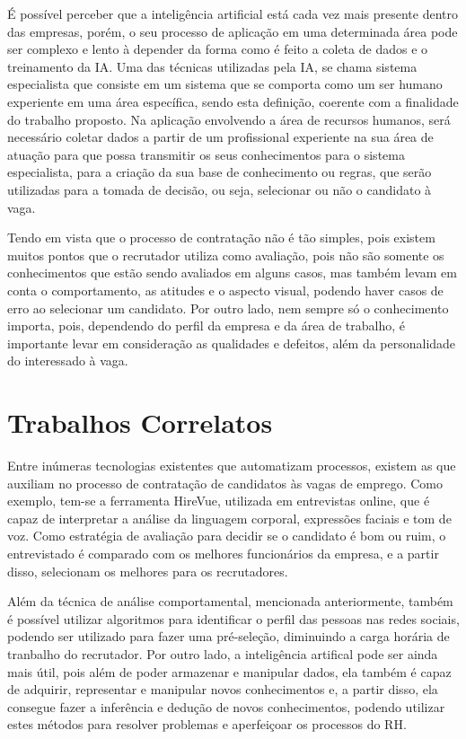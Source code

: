 \documentclass{document}
\begin{document}
    É possível perceber que a inteligência artificial está cada vez mais presente dentro das empresas, porém, o seu processo de aplicação em uma 
    determinada área pode ser complexo e lento à depender da forma como é feito a coleta de dados e o treinamento da IA. Uma das técnicas 
    utilizadas pela IA, se chama sistema especialista que consiste em um sistema que se comporta como um ser humano experiente em uma área
    específica, sendo esta definição, coerente com a finalidade do trabalho proposto. Na aplicação envolvendo a área de recursos humanos, 
    será necessário coletar dados a partir de um profissional experiente na sua área de atuação para que possa transmitir os seus conhecimentos
    para o sistema especialista, para a criação da sua base de conhecimento ou regras, que serão utilizadas para a tomada de decisão, ou seja,
    selecionar ou não o candidato à vaga. 

    Tendo em vista que o processo de contratação não é tão simples, pois existem muitos pontos que o recrutador utiliza como avaliação, pois
    não são somente os conhecimentos que estão sendo avaliados em alguns casos, mas também levam em conta o comportamento, as atitudes e o
    aspecto visual, podendo haver casos de erro ao selecionar um candidato. Por outro lado, nem sempre só o conhecimento importa, pois, dependendo
    do perfil da empresa e da área de trabalho, é importante levar em consideração as qualidades e defeitos, além da personalidade do interessado à vaga.

    \section{Trabalhos Correlatos}

    Entre inúmeras tecnologias existentes que automatizam processos, existem as que auxiliam no processo de contratação de candidatos às vagas
    de emprego. Como exemplo, tem-se a ferramenta HireVue, utilizada em entrevistas online, que é capaz de interpretar a análise da linguagem
    corporal, expressões faciais e tom de voz. Como estratégia de avaliação para decidir se o candidato é bom ou ruim, o entrevistado é comparado
    com os melhores funcionários da empresa, e a partir disso, selecionam os melhores para os recrutadores.

    Além da técnica de análise comportamental, mencionada anteriormente, também é possível utilizar algoritmos para identificar o perfil das pessoas
    nas redes sociais, podendo ser utilizado para fazer uma pré-seleção, diminuindo a carga horária de tranbalho do recrutador. Por outro lado,
    a inteligência artifical pode ser ainda mais útil, pois além de poder armazenar e manipular dados, ela também é capaz de adquirir, 
    representar e manipular novos conhecimentos e, a partir disso, ela consegue fazer a inferência e dedução de novos conhecimentos, podendo 
    utilizar estes métodos para resolver problemas e aperfeiçoar os processos do RH.
\end{document}
